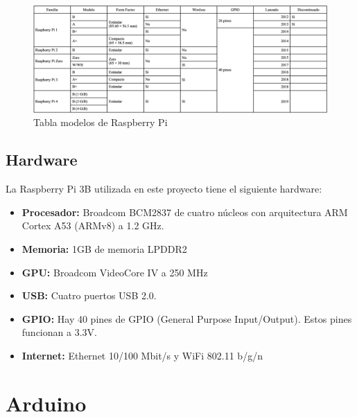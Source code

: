             \begin{figure}[ht]
                \centering
                \includegraphics[width=\textwidth]{imagenes/tabla_modelos_raspberry_pi.png}
                \caption{Tabla modelos de Raspberry Pi\cite{raspberry_pi_wikipedia_en}}
            \end{figure}

            \newpage


        \subsection{Hardware} %
        \label{sub:HardwareRaspberryPi}

            La Raspberry Pi 3B utilizada en este proyecto tiene el siguiente hardware\cite{raspberry_pi_hardware}:

            \begin{itemize}
                \item \textbf{Procesador:} Broadcom BCM2837 de cuatro núcleos con arquitectura ARM Cortex A53 (ARMv8) a
                1.2 GHz.
                \item \textbf{Memoria:} 1GB de memoria LPDDR2
                \item \textbf{GPU:} Broadcom VideoCore IV a 250 MHz
                \item \textbf{USB:} Cuatro puertos USB 2.0.
                \item \textbf{GPIO:} Hay 40 pines de GPIO (General Purpose Input/Output). Estos pines funcionan a 3.3V.
                \item \textbf{Internet:} Ethernet 10/100 Mbit/s y WiFi 802.11 b/g/n
            \end{itemize}



    \section{Arduino} %
    \label{sec:Arduino}

